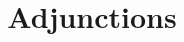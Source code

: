 \documentclass{ximera}
\title{Adjunctions}
\begin{document}
\begin{abstract}

\end{abstract}
\maketitle

\end{document}
